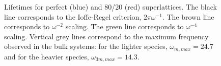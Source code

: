 \documentclass[aps,prb,preprint,preprintnumbers,amsmath,amssymb,floatfix,superscriptaddress]{revtex4}
\newcommand{\kv}{\mspace{-4.0mu}\left(\mspace{-8.0mu}
\begin{smallmatrix}&\pmb{\kappa} \\&\nu\end{smallmatrix}
\mspace{-3.0mu}\right)}
\begin{document}
\renewcommand{\textfraction}{0.0}
\begin{figure}%
\begin{center}
\renewcommand{\figure}{Fig.}
\caption{Lifetimes for perfect (blue) and 80/20 (red) superlattices. The black line corresponds to the Ioffe-Regel criterion, $2\pi\omega^{-1}$. The brown line corresponds to $\omega^{-2}$ scaling. The green line corresponds to $\omega^{-4}$ scaling. Vertical grey lines correspond to the maximum frequency observed in the bulk systems: for the lighter species, $\omega_{m,max}=24.7$ and for the heavier species, $\omega_{3m,max}=14.3$. } 
\label{FIG:lifetime}
\end{center}
\end{figure}

\begin{comment}
\begin{table}
\begin{center}
\begin{tabular*}{\textwidth}{c@{\extracolsep{\fill}}ccccc}
\hline\hline\noalign{\smallskip}
&\multicolumn{3}{c}{$N\times N$ Superlattice} \\
\cline{2-5}\noalign{\smallskip}
\hspace{1cm} & $2\times2$ & $4\times4$ & $8\times8$ & $14\times14$  \\
\noalign{\smallskip}\hline\noalign{\smallskip}
RMSE $\sqrt{\frac{\sum_{\pmb{\kappa}\nu}(\tau_{eff}\kv-\tau_{mixed}\kv)^2}{n}}$ &0.65 & 1.21 & 2.09 & 5.42\\
Mean $\overline{\tau_{mixed}\kv}$ &1.37 & 1.93 & 2.74 & 3.40\\
Standard Deviation $\sigma[\tau_{mixed}\kv]$ &2.34 & 2.66 & 5.53 & 11.84\\
\noalign{\smallskip}\hline\hline
\end{tabular*}
\end{center}
\renewcommand{\table}{Table.}
\caption{The root-mean-square error between Tamura theory effective lifetimes and NMD mixed lifetimes. The mean and standard deviation of the NMD mixed lifetimes are provided for context. %
}
\label{TB:taud}
\end{table}
\end{comment}
\end{document}
